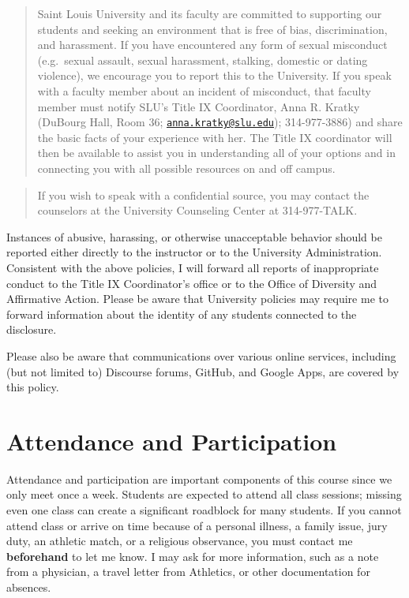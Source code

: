 \documentclass[
]{book}
\begin{document}
\begin{quote}
Saint Louis University and its faculty are committed to supporting our students and seeking an environment that is free of bias, discrimination, and harassment. If you have encountered any form of sexual misconduct (e.g.~sexual assault, sexual harassment, stalking, domestic or dating violence), we encourage you to report this to the University. If you speak with a faculty member about an incident of misconduct, that faculty member must notify SLU's Title IX Coordinator, Anna R. Kratky (DuBourg Hall, Room 36; \href{mailto:anna.kratky@slu.edu}{\nolinkurl{anna.kratky@slu.edu}}); 314-977-3886) and share the basic facts of your experience with her. The Title IX coordinator will then be available to assist you in understanding all of your options and in connecting you with all possible resources on and off campus.
\end{quote}

\begin{quote}
If you wish to speak with a confidential source, you may contact the counselors at the University Counseling Center at 314-977-TALK.
\end{quote}

Instances of abusive, harassing, or otherwise unacceptable behavior should be reported either directly to the instructor or to the University Administration. Consistent with the above policies, I will forward all reports of inappropriate conduct to the Title IX Coordinator's office or to the Office of Diversity and Affirmative Action. Please be aware that University policies may require me to forward information about the identity of any students connected to the disclosure.

Please also be aware that communications over various online services, including (but not limited to) Discourse forums, GitHub, and Google Apps, are covered by this policy.

\hypertarget{attendance-and-participation}{%
\section{Attendance and Participation}\label{attendance-and-participation}}

Attendance and participation are important components of this course since we only meet once a week. Students are expected to attend all class sessions; missing even one class can create a significant roadblock for many students. If you cannot attend class or arrive on time because of a personal illness, a family issue, jury duty, an athletic match, or a religious observance, you must contact me \textbf{beforehand} to let me know. I may ask for more information, such as a note from a physician, a travel letter from Athletics, or other documentation for absences.
\end{document}
